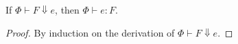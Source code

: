 \documentclass{llncs}
\newcommand{\mylet}[2]{\mathbf{let}\ #1 \ \mathbf{in} \ #2}
\renewcommand{\geq}{\geqslant}
\begin{document}
\begin{theorem}
  If $\Phi \vdash F \Downarrow e$, then $\Phi \vdash e : F$. 
\end{theorem}
\begin{proof}
  By induction on the derivation of $\Phi \vdash F \Downarrow e$. 
\end{proof}

\begin{comment}
  \begin{proof}
    By induction on the derivation of $\Phi \vdash F \Downarrow e$.

    \noindent \textit{Case.}

    \

    \infer[\text{if}~(\kappa :\ \Rightarrow A) \in \Phi] {\Phi \vdash
      \sigma A \Downarrow \kappa} {}


    Obvious.

    \noindent \textit{Case.}

    \

    \infer[\text{if}~(\kappa : G_1,..., G_m \Rightarrow A) \in \Phi, m
    \geq 1] {\Phi \vdash \sigma A \Downarrow \kappa~e_1 \cdots e_n} {
      \Phi \vdash \sigma G_1 \Downarrow e_1 \quad \cdots \quad \Phi
      \vdash \sigma G_n \Downarrow e_n }


    By IH, we have $\Phi \vdash e_1 : \sigma G_1 \cdots \Phi \vdash
    e_n : \sigma G_n$. Thus by \textsc{Inst} and \textsc{App}, we have
    $\Phi \vdash \kappa~e_1 \cdots e_n : \sigma A$.

    \noindent \textit{Case.}

    \

    \infer{\Phi \vdash F \Downarrow \mylet{\alpha = e}{\alpha} }{\Phi,
      \alpha : F \vdash F \Downarrow e & \mathrm{HNF}(e)}

    By IH, we have $\Phi, \alpha : F \vdash e : F$, thus by
    \textsc{Let} rule, we have $\Phi \vdash \mylet{\alpha = e}{\alpha}
    : F$.

    \noindent \textit{Case.}

    \

    \infer {\Phi \vdash \underline{G} \Rightarrow B \Downarrow \lambda
      \underline{\alpha} . e} {\Phi, \underline{\alpha} :
      \underline{G} \vdash B \Downarrow e}

    By IH, we have $\Phi, \underline{\alpha} :\underline{G} \vdash e :
    B$, thus we can apply \textsc{Abs} rule, which give us $\Phi
    \vdash \lambda \underline{\alpha} . e : \underline{G} \Rightarrow
    B $.
  \end{proof}


  \begin{definition}
  
    \

    $\phi(\kappa) := \kappa$

    $\phi(\alpha) := \alpha$

    $\phi(\mylet{\alpha = e}{\alpha}) := \mathbf{fix}(\lambda \alpha
    . \phi(e))$

    $\phi(\lambda \alpha . e) := \lambda \alpha . \phi(e)$

    $\phi( e\ e') := \phi(e)\ \phi(e')$
  \end{definition}
\end{comment}
\end{document}
